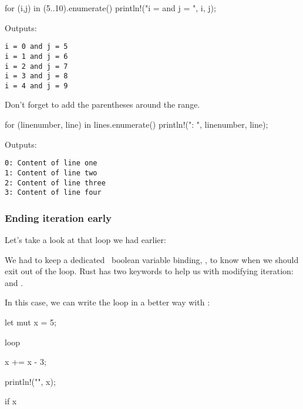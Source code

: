 \begin{rustc}
for (i,j) in (5..10).enumerate() {
    println!("i = {} and j = {}", i, j);
}
\end{rustc}

Outputs:

\begin{verbatim}
i = 0 and j = 5
i = 1 and j = 6
i = 2 and j = 7
i = 3 and j = 8
i = 4 and j = 9
\end{verbatim}

Don't forget to add the parentheses around the range.


\begin{rustc}
for (linenumber, line) in lines.enumerate() {
    println!("{}: {}", linenumber, line);
}
\end{rustc}

Outputs:

\begin{verbatim}
0: Content of line one
1: Content of line two
2: Content of line three
3: Content of line four
\end{verbatim}

\subsubsection*{Ending iteration early}

Let's take a look at that  loop we had earlier:


We had to keep a dedicated \mut\ boolean variable binding, , to know when we should exit out of the loop. Rust 
has two keywords to help us with modifying iteration:  and .

\blank

In this case, we can write the loop in a better way with :

\begin{rustc}
let mut x = 5;

loop {
    x += x - 3;

    println!("{}", x);

    if x %
}
\end{rustc}

